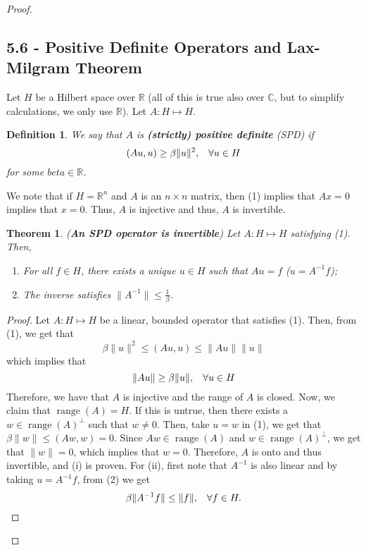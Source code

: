 \documentclass[oneside]{book}
\newtheorem{theorem}{Theorem}
\newtheorem{definition}{Definition}
\newcommand{\R}{{\mathbb R}}
\newcommand{\C}{{\mathbb C}}
\DeclareMathOperator{\range}{range}
\newcommand{\Ai}{A^{-1}}
\begin{document}
\begin{proof}
\subsection*{5.6 - Positive Definite Operators and Lax-Milgram Theorem}
\setcounter{equation}{0}
Let $H$ be a Hilbert space over $\R$ (all of this is true also over $\C$, but to simplify calculations, we only use $\R$). Let $A: H \mapsto H$.
\begin{definition}
We say that $A$ is \textbf{(strictly) positive definite} (SPD) if 
\begin{equation}
(Au, u) \geq \beta \| u \|^2, \hspace{3mm} \forall u \in H
\end{equation}
for some $beta \in \R$. 
\end{definition}
We note that if $H = \R^n$ and $A$ is an $n \times n$ matrix, then (1) implies that $Ax = 0$ implies that $x = 0$. Thus, $A$ is injective and thus, $A$ is invertible. 
\begin{theorem}
(\textbf{An SPD operator is invertible}) Let $A: H \mapsto H$ satisfying (1). Then, 
\begin{enumerate}
\item[(i)] For all $f \in H$, there exists a unique $u \in H$ such that $Au = f$ ($u = A^{-1} f$);
\item[(ii)] The inverse satisfies $\| A^{-1} \| \leq \frac{1}{\beta}$. 
\end{enumerate}
\end{theorem}
\begin{proof}
Let $A: H \mapsto H$ be a linear, bounded operator that satisfies (1). Then, from (1), we get that 
\[ \beta \| u \|^2 \leq (Au, u) \leq \| Au \| \| u \| \]
which implies that 
\begin{equation}
\| Au \| \geq \beta \| u \|, \hspace{3mm} \forall u \in H
\end{equation}
Therefore, we have that $A$ is injective and the range of $A$ is closed. Now, we claim that $\range(A) = H$. If this is untrue, then there exists a $w \in \range(A)^{\perp}$ such that $w \neq 0$. Then, take $u = w$ in (1), we get that $\beta \| w \| \leq (Aw, w) = 0$. Since $Aw \in \range(A)$ and $w \in \range(A)^{\perp}$, we get that $\| w \| = 0$, which implies that $w = 0$. Therefore, $A$ is onto and thus invertible, and (i) is proven. For (ii), first note that $\Ai$ is also linear and by taking $u = \Ai f$, from (2) we get 
\[ \beta \| \Ai f\| \leq \| f \|, \hspace{3mm} \forall f \in H.\]

\end{proof}
\end{proof}
\end{document}
